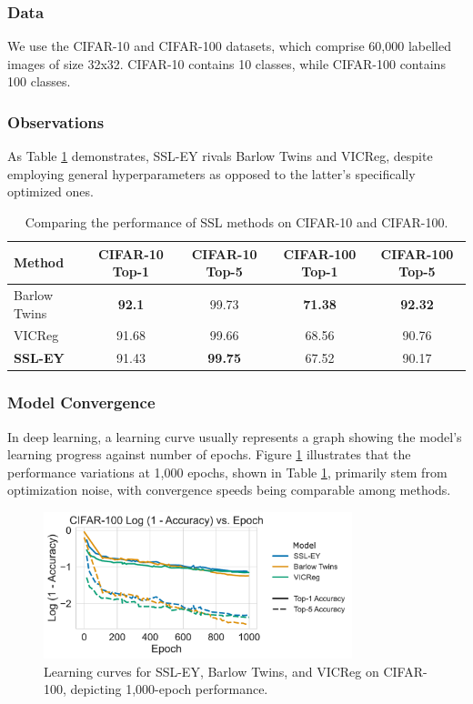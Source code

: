 \subsubsection{Data} We use the CIFAR-10 and CIFAR-100 datasets, which comprise 60,000 labelled images of size 32x32.
CIFAR-10 contains 10 classes, while CIFAR-100 contains 100 classes.

\subsubsection{Observations} As Table \ref{tab:selfsup} demonstrates, SSL-EY rivals Barlow Twins and VICReg, despite employing general hyperparameters as opposed to the latter's specifically optimized ones.

\begin{table}[H]
    \centering
    \begin{tabular}{|l|c|c|c|c|}
        \hline
        Method          & CIFAR-10 Top-1 & CIFAR-10 Top-5 & CIFAR-100 Top-1 & CIFAR-100 Top-5 \\
        \hline
        Barlow Twins    & \textbf{92.1}  & 99.73          & \textbf{71.38}  & \textbf{92.32}  \\
        \hline
        VICReg          & 91.68          & 99.66          & 68.56           & 90.76           \\
        \hline
        \textbf{SSL-EY} & 91.43          & \textbf{99.75} & 67.52           & 90.17           \\
        \hline
    \end{tabular}
    \caption{Comparing the performance of SSL methods on CIFAR-10 and CIFAR-100.}
    \label{tab:selfsup}
\end{table}

\subsubsection{Model Convergence} In deep learning, a learning curve usually represents a graph showing the model's learning progress against number of epochs.
Figure \ref{fig:ssl_learning_curve_cifar100_top5} illustrates that the performance variations at 1,000 epochs, shown in Table \ref{tab:selfsup}, primarily stem from optimization noise, with convergence speeds being comparable among methods.

\begin{figure}[H]
    \centering
    \includegraphics[width=0.8\textwidth]{figures/SSL/cifar100_learning_curve_log_error}
    \caption{Learning curves for SSL-EY, Barlow Twins, and VICReg on CIFAR-100, depicting 1,000-epoch performance.}
    \label{fig:ssl_learning_curve_cifar100_top5}
\end{figure}

